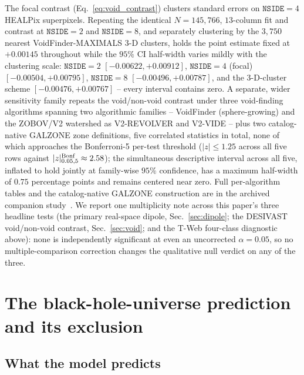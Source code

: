 \documentclass[twocolumn,linenumbers]{aastex702}
\newcommand{\nside}{\texttt{NSIDE}}
\begin{document}
The focal contrast (Eq.~\ref{eq:void_contrast}) clusters standard errors on
$\nside=4$ HEALPix superpixels. Repeating the identical $N=145{,}766$,
$13$-column fit and contrast at $\nside=2$ and $\nside=8$, and separately
clustering by the $3{,}750$ nearest VoidFinder-MAXIMALS 3-D clusters, holds
the point estimate fixed at $+0.00145$ throughout while the $95\%$ CI
half-width varies mildly with the clustering scale: $\nside=2$
$[-0.00622,+0.00912]$, $\nside=4$ (focal) $[-0.00504,+0.00795]$, $\nside=8$
$[-0.00496,+0.00787]$, and the 3-D-cluster scheme $[-0.00476,+0.00767]$ --
every interval contains zero. A separate, wider sensitivity family repeats
the void/non-void contrast under three void-finding algorithms spanning two
algorithmic families -- VoidFinder (sphere-growing) and the ZOBOV/V2
watershed as V2-REVOLVER and V2-VIDE -- plus two catalog-native GALZONE
zone definitions, five correlated statistics in total, none of which
approaches the Bonferroni-5 per-test threshold ($|z|\leq1.25$ across all
five rows against $|z|^{\rm Bonf}_{0.05,5}\approx2.58$); the simultaneous
descriptive interval across all five, inflated to hold jointly at
family-wise $95\%$ confidence, has a maximum half-width of $0.75$
percentage points and remains centered near zero. Full per-algorithm tables
and the catalog-native GALZONE construction are in the archived companion
study~\cite{Golden:P5v147}. We report one multiplicity note across this
paper's three headline tests (the primary real-space dipole,
Sec.~\ref{sec:dipole}; the DESIVAST void/non-void contrast,
Sec.~\ref{sec:void}; and the T-Web four-class diagnostic above): none is
independently significant at even an uncorrected $\alpha=0.05$, so no
multiple-comparison correction changes the qualitative null verdict on any
of the three.

\section{The black-hole-universe prediction and its exclusion}
\label{sec:bh}

\subsection{What the model predicts}
\label{sec:bh_predicts}
\end{document}
